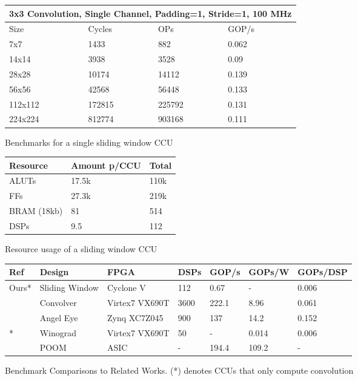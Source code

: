 \begin{figure}
\centering
\small
\begin{tabular}{ |p{3cm}|p{3cm}|p{3cm}|p{3cm}|  }
	\hline
	\multicolumn{4}{|c|}{3x3 Convolution, Single Channel, Padding=1, Stride=1, 100 MHz} \\
	\hline
	Size & Cycles & OPs & GOP/s \\
	\hline
	7x7       & 1433      & 882      & 0.062\\
	14x14    & 3938     & 3528    & 0.09 \\
	28x28   & 10174    & 14112    & 0.139\\
	56x56   & 42568   & 56448  & 0.133\\
	112x112  & 172815  & 225792 & 0.131 \\
	224x224 & 812774  & 903168 & 0.111\\
	
	\hline
\end{tabular}
\label{result_1}
\caption{Benchmarks for a single sliding window CCU}
\end{figure}

\begin{figure}
	\centering
	\small
	\begin{tabular}{ |p{3cm}|p{3cm}|p{3cm}| }
		\hline
		Resource & Amount p/CCU & Total \\
		\hline
		ALUTs      & 17.5k      & 110k   \\
		FFs           & 27.3k     & 219k     \\
		BRAM (18kb)  & 81    & 514  \\
		DSPs   & 9.5  & 112\\
		
		\hline
	\end{tabular}
	\label{result_2}
	\caption{Resource usage of a sliding window CCU}
\end{figure}

\begin{figure}
	\centering
	\small
	\begin{tabular}{ |p{1cm}|p{3cm}|p{3cm}|p{1.1cm}|p{1.1cm}|p{1.5cm}|p{2cm}|  }
		\hline
		Ref & Design & FPGA & DSPs & GOP/s & GOPs/W & GOPs/DSP \\
		\hline
		Ours* & Sliding Window & Cyclone V          & 112    & 0.67 & -      & 0.006 \\
		\cite{liu2016automatic} & Convolver                 & Virtex7 VX690T & 3600 & 222.1 & 8.96 & 0.061 \\
		\cite{guo2018angel} & Angel Eye                  & Zynq XC7Z045  & 900   & 137    & 14.2 & 0.152 \\
		\cite{dicecco2016caffeinated}* & Winograd                   & Virtex7 VX690T & 50     & -       & 0.014 & 0.006 \\
		\cite{tu2017deep} & POOM                        & ASIC                   & -        & 194.4 & 109.2 & - \\
		\hline
	\end{tabular}
	\label{result_others}
	\caption{Benchmark Comparisons to Related Works. (*) denotes CCUs that only compute convolution}
\end{figure}


